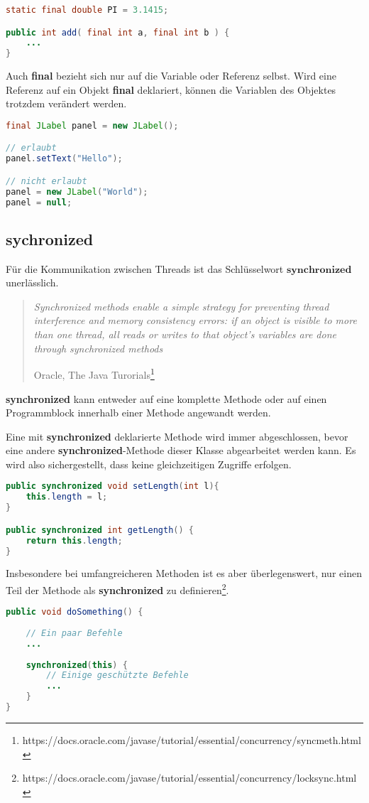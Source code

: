 \begin{lstlisting}[language=JAVA]
static final double PI = 3.1415;

public int add( final int a, final int b ) {
	...
}
\end{lstlisting}

Auch \textbf{final} bezieht sich nur auf die Variable oder Referenz selbst. Wird eine Referenz auf ein Objekt \textbf{final} deklariert, können die Variablen des Objektes trotzdem verändert werden.

\begin{lstlisting}[language=JAVA]
final JLabel panel = new JLabel();

// erlaubt
panel.setText("Hello");

// nicht erlaubt
panel = new JLabel("World");
panel = null;
\end{lstlisting}

\subsection*{sychronized}
Für die Kommunikation zwischen Threads ist das Schlüsselwort $\textbf{synchronized}$ unerlässlich. 
\begin{quote}%
\emph{Synchronized methods enable a simple strategy for preventing thread interference and memory consistency errors: if an object is visible to more than one thread, all reads or writes to that object's variables are done through synchronized methods}
\begin{flushright}Oracle, The Java Turorials\footnote{https://docs.oracle.com/javase/tutorial/essential/concurrency/syncmeth.html}\end{flushright}
\end{quote}
\textbf{synchronized} kann entweder auf eine komplette Methode oder auf einen Programmblock innerhalb einer Methode angewandt werden.

Eine mit \textbf{synchronized} deklarierte Methode wird immer abgeschlossen, bevor eine andere \textbf{synchronized}-Methode dieser Klasse abgearbeitet werden kann. Es wird also sichergestellt, dass keine gleichzeitigen Zugriffe erfolgen.
\begin{lstlisting}[language=JAVA]
public synchronized void setLength(int l){
	this.length = l;
}

public synchronized int getLength() {
	return this.length;
}
\end{lstlisting}

Insbesondere bei umfangreicheren Methoden ist es aber überlegenswert, nur einen Teil der Methode als \textbf{synchronized} zu definieren\footnote{https://docs.oracle.com/javase/tutorial/essential/concurrency/locksync.html}.
\begin{lstlisting}[language=JAVA]
public void doSomething() {
	
	// Ein paar Befehle
	...
	
	synchronized(this) {
		// Einige geschützte Befehle
		...
	}
}
\end{lstlisting}


